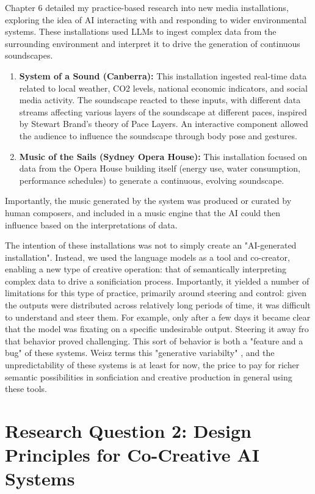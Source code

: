 Chapter 6 detailed my practice-based research into new media installations, exploring the idea of AI interacting with and responding to wider environmental systems. These installations used LLMs to ingest complex data from the surrounding environment and interpret it to drive the generation of continuous soundscapes.

\begin{enumerate}
    \item \textbf{System of a Sound (Canberra):} This installation ingested real-time data related to local weather, CO2 levels, national economic indicators, and social media activity. The soundscape reacted to these inputs, with different data streams affecting various layers of the soundscape at different paces, inspired by Stewart Brand's theory of Pace Layers. An interactive component allowed the audience to influence the soundscape through body pose and gestures.
    \item \textbf{Music of the Sails (Sydney Opera House):} This installation focused on data from the Opera House building itself (energy use, water consumption, performance schedules) to generate a continuous, evolving soundscape.
\end{enumerate}

Importantly, the music generated by the system was produced or curated by human composers, and included in a music engine that the AI could then influence based on the interpretations of data. 

The intention of these installations was not to simply create an "AI-generated installation". Instead, we used the language models as a tool and co-creator, enabling a new type of creative operation: that of semantically interpreting complex data to drive a sonificiation process. Importantly, it yielded a number of limitations for this type of practice, primarily around steering and control: given the outputs were distributed across relatively long periods of time, it was difficult to understand and steer them. For example, only after a few days it became clear that the model was fixating on a specific undesirable output. Steering it away fro that behavior proved challenging. This sort of behavior is both a "feature and a bug" of these systems. Weisz terms this "generative variabilty" \cite{Weisz2024-io}, and the unpredictability of these systems is at least for now, the price to pay for richer semantic possibilities in sonficiation and creative production in general using these tools. 


\section{Research Question 2: Design Principles for Co-Creative AI Systems}


